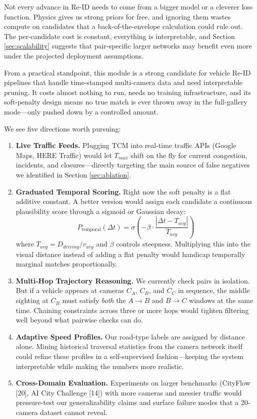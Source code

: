 \documentclass{ijitcs}
\newcommand{\rev}[1]{#1}
\begin{document}
Not every advance in Re-ID needs to come from a bigger model or a cleverer loss function. Physics gives us strong priors for free, and ignoring them wastes compute on candidates that a back-of-the-envelope calculation could rule out. The per-candidate cost is constant, everything is interpretable, and \rev{Section \ref{sec:scalability} suggests that pair-specific larger networks may benefit even more under the projected deployment assumptions.}

\rev{From a practical standpoint, this module is a strong candidate for vehicle Re-ID pipelines that handle time-stamped multi-camera data and need interpretable pruning. It costs almost nothing to run, needs no training infrastructure, and its soft-penalty design means no true match is ever thrown away in the full-gallery mode---only pushed down by a controlled amount.}

We see five directions worth pursuing:
\begin{enumerate}
    \item \textbf{Live Traffic Feeds.} Plugging TCM into real-time traffic APIs (Google Maps, HERE Traffic) would let $T_{max}$ shift on the fly for current congestion, incidents, and closures---directly targeting the main source of false negatives we identified in Section \ref{sec:ablation}.
    \item \textbf{Graduated Temporal Scoring.} Right now the soft penalty is a flat additive constant. A better version would assign each candidate a continuous plausibility score through a sigmoid or Gaussian decay:
    \begin{equation}
        P_{\text{temporal}}(\Delta t) = \sigma\left(-\beta \cdot \frac{|\Delta t - T_{avg}|}{T_{avg}}\right)
    \end{equation}
    where $T_{avg} = D_{driving}/v_{avg}$ and $\beta$ controls steepness. Multiplying this into the visual distance instead of adding a flat penalty would handicap temporally marginal matches proportionally.
    \item \textbf{Multi-Hop Trajectory Reasoning.} We currently check pairs in isolation. But if a vehicle appears at cameras $C_A$, $C_B$, and $C_C$ in sequence, the middle sighting at $C_B$ must satisfy \textit{both} the $A{\to}B$ and $B{\to}C$ windows at the same time. Chaining constraints across three or more hops would tighten filtering well beyond what pairwise checks can do.
    \item \textbf{Adaptive Speed Profiles.} Our road-type labels are assigned by distance alone. Mining historical traversal statistics from the camera network itself could refine these profiles in a self-supervised fashion---keeping the system interpretable while making the numbers more realistic.
    \item \textbf{Cross-Domain Evaluation.} Experiments on larger benchmarks (CityFlow [20], AI City Challenge [14]) with more cameras and messier traffic would pressure-test our generalizability claims and surface failure modes that a 20-camera dataset cannot reveal.
\end{enumerate}
\end{document}
